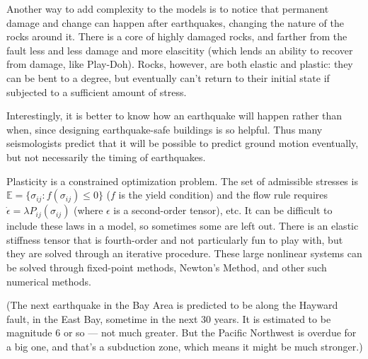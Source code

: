 Another way to add complexity to the models is to notice that permanent damage and change can happen after earthquakes, changing the nature of the rocks around it. There is a core of highly damaged rocks, and farther from the fault less and less damage and more elascitity (which lends an ability to recover from damage, like Play-Doh). Rocks, however, are both elastic and plastic: they can be bent to a degree, but eventually can't return to their initial state if subjected to a sufficient amount of stress.

Interestingly, it is better to know how an earthquake will happen rather than when, since designing earthquake-safe buildings is so helpful. Thus many seismologists predict that it will be possible to predict ground motion eventually, but not necessarily the timing of earthquakes.

Plasticity is a constrained optimization problem. The set of admissible stresses is $\mathbb E = \{\sigma_{ij}:f(\sigma_{ij}) \le 0\}$ ($f$ is the yield condition) and the flow rule requires $\dot\epsilon = \lambda P_{ij}(\sigma_{ij})$ (where $\epsilon$ is a second-order tensor), etc. It can be difficult to include these laws in a model, so sometimes some are left out. There is an elastic stiffness tensor that is fourth-order and not particularly fun to play with, but they are solved through an iterative procedure. These large nonlinear systems can be solved through fixed-point methods, Newton's Method, and other such numerical methods.

(The next earthquake in the Bay Area is predicted to be along the Hayward fault, in the East Bay, sometime in the next 30 years. It is estimated to be magnitude 6 or so --- not much greater. But the Pacific Northwest is overdue for a big one, and that's a subduction zone, which means it might be much stronger.)
